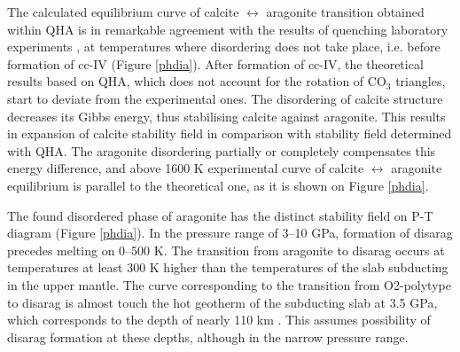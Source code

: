 \documentclass[journal=jacsat,manuscript=article]{achemso}
\begin{document}
The calculated equilibrium curve of calcite $\leftrightarrow$ aragonite transition obtained within QHA is in remarkable agreement with the results of quenching laboratory experiments \cite{shatskiy2018, fedoraeva2019}, at temperatures where disordering does not take place, i.e. before formation of cc-IV (Figure \ref{phdia}). 
After formation of cc-IV, the theoretical results based on QHA, which does not account for the rotation of CO$_3$ triangles, start to deviate from the experimental ones. 
The disordering of calcite structure decreases its Gibbs energy, thus stabilising calcite against aragonite. 
This results in expansion of calcite stability field in comparison with stability field determined with QHA.
The aragonite disordering partially or completely compensates this energy difference, and above 1600 K experimental curve of calcite $\leftrightarrow$ aragonite equilibrium is parallel to the theoretical one, as it is shown on Figure \ref{phdia}.

The found disordered phase of aragonite has the distinct stability field on P-T diagram (Figure \ref{phdia}). 
In the pressure range of 3--10 GPa, formation of disarag precedes melting on 0--500 K. 
The transition from aragonite to disarag occurs at temperatures at least 300 K higher than the temperatures of the slab subducting in the upper mantle.
The curve corresponding to the transition from O2-polytype to disarag is almost touch the hot geotherm of the subducting slab at 3.5 GPa, which corresponds to the depth of nearly 110 km \cite{syracuse2010}.
This assumes possibility of disarag formation at these depths, although in the narrow pressure range.
\end{document}
